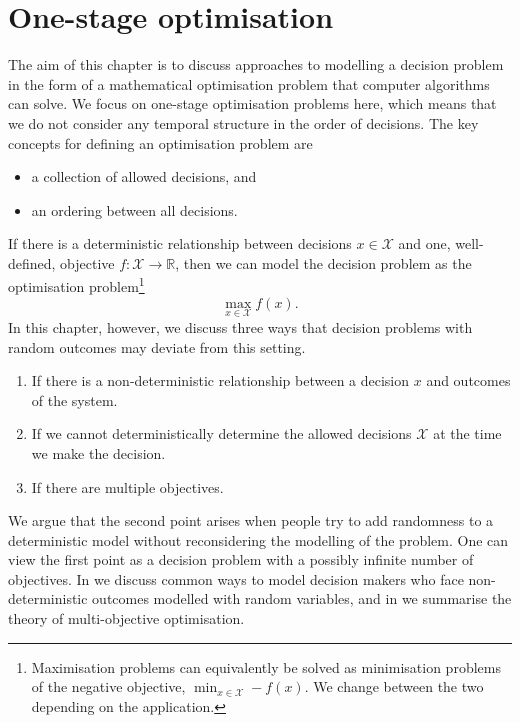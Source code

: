 \documentclass[main.tex]{subfiles}
\begin{document}
\chtodolist{} %

\chapter{One-stage optimisation}\label{ch:onestage}

The aim of this chapter is to discuss approaches to modelling a
decision problem in the form of a mathematical optimisation problem
that computer algorithms can solve.
We focus on one-stage optimisation problems here, which means that
we do not consider any temporal structure in the order of decisions.
The key concepts for defining an optimisation problem are
\begin{itemize}
\item a
  collection of allowed decisions, and
\item an ordering between all
  decisions.
\end{itemize}

If there is a deterministic relationship between decisions
$x\in\mathcal{X}$ and one, well-defined, objective
$f:\mathcal{X}\to\mathbb{R}$, then we can model the decision problem
as the optimisation problem\footnote{Maximisation problems can
  equivalently be solved as minimisation problems of the negative
  objective, $\min_{x\in\mathcal{X}}-f(x)$. We change between the two
  depending on the application.}
\begin{equation}\label{eq:deterministic_setting}
  \max_{x\in\mathcal{X}} f(x).
\end{equation}
In this chapter, however, we discuss three ways that
decision problems with random outcomes may deviate from this setting.
\begin{enumerate}
\item If there is a non-deterministic relationship between a decision
  $x$ and outcomes of the system.
\item If we cannot  deterministically determine the allowed decisions
  $\mathcal{X}$ at the time we make the decision.
\item If there are multiple objectives.
\end{enumerate}
We argue that the second point arises when people try to add
randomness to a deterministic model without reconsidering the
modelling of the problem. One can view the first point as a decision
problem with a possibly infinite number of objectives.
In
 we
discuss common ways to model decision makers who face
non-deterministic outcomes modelled with random variables, and
in  we summarise the theory of multi-objective
optimisation.
\end{document}

